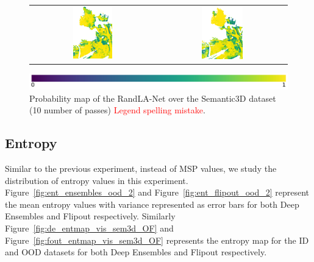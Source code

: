 \begin{figure}[h!]
\begin{tabular}{cc}
            \includegraphics[width=0.33\textwidth, height=0.18\textheight]{images/ood_imgs/fout_sem3d/fout_prob_3.pdf}&
            \includegraphics[width=0.33\textwidth, height=0.18\textheight]{images/sem3d_of/fout_prob_sem3d_of_3.pdf}\\
        \end{tabular}
        \includegraphics[scale=0.45]{images/prob_legend.pdf}
        \caption{Probability map of the RandLA-Net over the Semantic3D dataset (10 number of passes) \textcolor{red}{Legend spelling mistake}.}
        \label{fig:fout_probmap_vis_sem3d_OF}
    \end{figure} 
    \FloatBarrier


    \subsection{Entropy}
    Similar to the previous experiment, instead of MSP values, we study the distribution of entropy values in this experiment.
    Figure~\ref{fig:ent_ensembles_ood_2} and Figure~\ref{fig:ent_flipout_ood_2} represent the mean entropy values with variance represented as error bars for both Deep Ensembles and Flipout respectively.
    Similarly Figure~\ref{fig:de_entmap_vis_sem3d_OF} and Figure~\ref{fig:fout_entmap_vis_sem3d_OF} represents the entropy map for the ID and OOD datasets for both Deep Ensembles and Flipout respectively.

